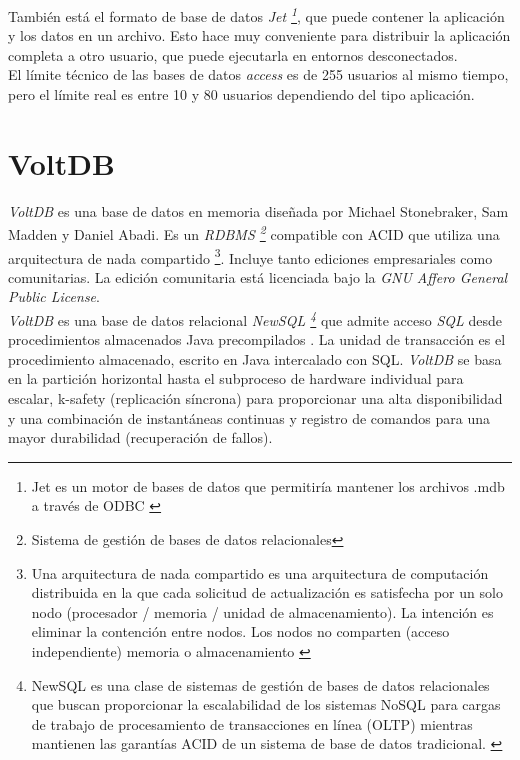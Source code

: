 \documentclass[11pt,a4paper]{article}
\begin{document}
También está el formato de base de datos \emph{Jet \footnote{Jet es un motor de bases de datos que permitiría mantener los archivos .mdb a través de ODBC \cite{ACC:8}}}, que puede contener la aplicación y los datos en un archivo. Esto hace muy conveniente para distribuir la aplicación completa a otro usuario, que puede ejecutarla en entornos desconectados. \cite{ACC:6}\\

El límite técnico de las bases de datos \emph{access} es de 255 usuarios al mismo tiempo, pero el límite real es entre 10 y 80 usuarios dependiendo del tipo aplicación. \cite{ACC:4}\\

\newpage
\section{VoltDB}
\emph{VoltDB} es una base de datos en memoria diseñada por Michael Stonebraker, Sam Madden y Daniel Abadi. Es un \emph{RDBMS \footnote{Sistema de gestión de bases de datos relacionales }} compatible con ACID que utiliza una arquitectura de nada compartido \footnote{Una arquitectura de nada compartido es una arquitectura de computación distribuida en la que cada solicitud de actualización es satisfecha por un solo nodo (procesador / memoria / unidad de almacenamiento). La intención es eliminar la contención entre nodos. Los nodos no comparten (acceso independiente) memoria o almacenamiento \cite{VOLT:1}}. Incluye tanto ediciones empresariales como comunitarias. La edición comunitaria está licenciada bajo la \emph{GNU Affero General Public License}. \cite{VOLT:2}\\

\emph{VoltDB} es una base de datos relacional \emph{NewSQL \footnote{NewSQL es una clase de sistemas de gestión de bases de datos relacionales que buscan proporcionar la escalabilidad de los sistemas NoSQL para cargas de trabajo de procesamiento de transacciones en línea (OLTP) mientras mantienen las garantías ACID de un sistema de base de datos tradicional. \cite{VOLT:3}}} que admite acceso \emph{SQL} desde procedimientos almacenados Java precompilados . La unidad de transacción es el procedimiento almacenado, escrito en Java intercalado con SQL. \emph{VoltDB} se basa en la partición horizontal hasta el subproceso de hardware individual para escalar, k-safety (replicación síncrona) para proporcionar una alta disponibilidad y una combinación de instantáneas continuas y registro de comandos para una mayor durabilidad (recuperación de fallos).\cite{VOLT:2}\\
\end{document}
